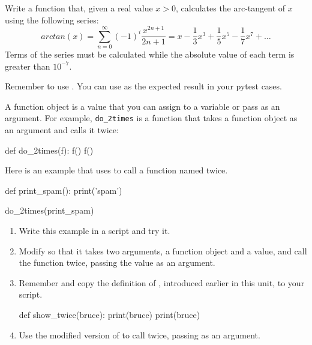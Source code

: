 \begin{exercise}
Write a function that, given a real value $x > 0$, calculates the arc-tangent of $x$ using the following series:
$$arctan(x) = \sum_{n=0}^{\infty}(-1)^{i}\frac{x^{2n+1}}{2n+1}= x - \frac{1}{3}x^{3}+\frac{1}{5}x^{5}-\frac{1}{7}x^{7}+\dots$$
Terms of the series must be calculated while the absolute value of each term is greater than $10^{-7}$.

Remember to use . You can use  as the expected result in your pytest cases.
\end{exercise}



\begin{exercise}

A function object is a value that you can assign to a variable or pass as an argument. For example, \verb"do_2times" is a function that takes a function object as an argument and calls it twice:

\begin{python}
def do_2times(f):
    f()
    f()
\end{python}

Here is an example that uses  to call a function named  twice.

\begin{python}
def print_spam():
    print('spam')

do_2times(print_spam)
\end{python}

\begin{enumerate}

\item Write this example in a script and try it.

\item Modify  so that it takes two arguments, a
function object and a value, and call the function twice,
passing the value as an argument.

\item Remember and copy the definition of
, introduced earlier in this unit, to your script.

\begin{python}[frame=single]
def show_twice(bruce):
    print(bruce)
    print(bruce)
\end{python}


\item Use the modified version of  to call  twice, passing  as an argument.


\end{enumerate}
\end{exercise}
